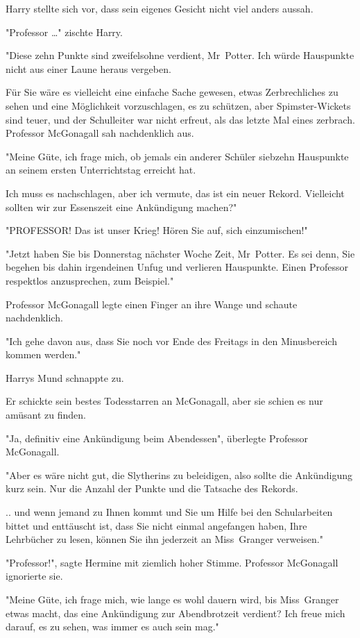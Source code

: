 {Harry stellte sich vor, dass sein eigenes Gesicht nicht viel anders aussah.

"Professor …" zischte Harry.

"Diese zehn Punkte sind zweifelsohne verdient, Mr~Potter. Ich würde Hauspunkte nicht aus einer Laune heraus vergeben.

Für Sie wäre es vielleicht eine einfache Sache gewesen, etwas Zerbrechliches zu sehen und eine Möglichkeit vorzuschlagen, es zu schützen, aber Spimster-Wickets sind teuer, und der Schulleiter war nicht erfreut, als das letzte Mal eines zerbrach. Professor McGonagall sah nachdenklich aus.

"Meine Güte, ich frage mich, ob jemals ein anderer Schüler siebzehn Hauspunkte an seinem ersten Unterrichtstag erreicht hat.

Ich muss es nachschlagen, aber ich vermute, das ist ein neuer Rekord. Vielleicht sollten wir zur Essenszeit eine Ankündigung machen?"

"PROFESSOR! Das ist unser Krieg! Hören Sie auf, sich einzumischen!"

"Jetzt haben Sie bis Donnerstag nächster Woche Zeit, Mr~Potter. Es sei denn, Sie begehen bis dahin irgendeinen Unfug und verlieren Hauspunkte. Einen Professor respektlos anzusprechen, zum Beispiel."

Professor McGonagall legte einen Finger an ihre Wange und schaute nachdenklich.

"Ich gehe davon aus, dass Sie noch vor Ende des Freitags in den Minusbereich kommen werden."

Harrys Mund schnappte zu.

Er schickte sein bestes Todesstarren an McGonagall, aber sie schien es nur amüsant zu finden.

"Ja, definitiv eine Ankündigung beim Abendessen", überlegte Professor McGonagall.

"Aber es wäre nicht gut, die Slytherins zu beleidigen, also sollte die Ankündigung kurz sein. Nur die Anzahl der Punkte und die Tatsache des Rekords.

.. und wenn jemand zu Ihnen kommt und Sie um Hilfe bei den Schularbeiten bittet und enttäuscht ist, dass Sie nicht einmal angefangen haben, Ihre Lehrbücher zu lesen, können Sie ihn jederzeit an Miss~Granger verweisen."

"Professor!", sagte Hermine mit ziemlich hoher Stimme. Professor McGonagall ignorierte sie.

"Meine Güte, ich frage mich, wie lange es wohl dauern wird, bis Miss~Granger etwas macht, das eine Ankündigung zur Abendbrotzeit verdient? Ich freue mich darauf, es zu sehen, was immer es auch sein mag."

}
